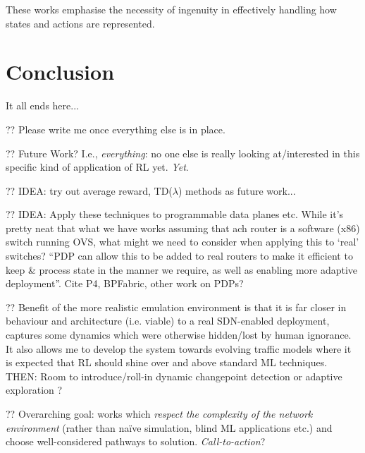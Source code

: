 \documentclass[conference, letterpaper, 10pt, times]{IEEEtran}
\begin{document}
These works emphasise the necessity of ingenuity in effectively handling how states and actions are represented.

\section{Conclusion}

It all ends here...

?? Please write me once everything else is in place.

?? Future Work? I.e., \emph{everything}: no one else is really looking at/interested in this specific kind of application of RL yet. \emph{Yet}.

?? IDEA: try out average reward, TD($\lambda$) methods as future work...

?? IDEA: Apply these techniques to programmable data planes etc. While it's pretty neat that what we have works assuming that ach router is a software (x86) switch running OVS, what might we need to consider when applying this to `real' switches? ``PDP can allow this to be added to real routers to make it efficient to keep \& process state in the manner we require, as well as enabling more adaptive deployment''. Cite P4, BPFabric, other work on PDPs?

?? Benefit of the more realistic emulation environment is that it is far closer in behaviour and architecture (i.e. viable) to a real SDN-enabled deployment, captures some dynamics which were otherwise hidden/lost by human ignorance. It also allows me to develop the system towards evolving traffic models where it is expected that RL should shine over and above standard ML techniques. THEN: Room to introduce/roll-in dynamic changepoint detection or adaptive exploration \cite{DBLP:conf/ki/Tokic10, DBLP:conf/ki/TokicP11, DBLP:conf/annpr/TokicP12}?

?? Overarching goal: works which \emph{respect the complexity of the network environment} (rather than na\"{i}ve simulation, blind ML applications etc.) and choose well-considered pathways to solution. \emph{Call-to-action}?
\end{document}
